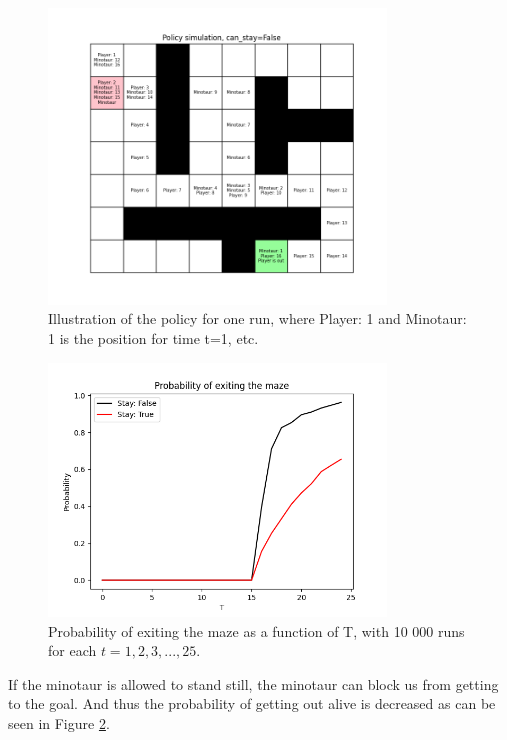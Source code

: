 \documentclass{article}
\begin{document}
\begin{figure}[H]
    \centering
    \includegraphics[width=0.8\textwidth]{Lab_1/images/problem_1/MazeRun_Nov-16-2020_11-55-45.png}
    \caption{\small Illustration of the policy for one run, where Player: 1 and Minotaur: 1 is the position for time t=1, etc. }
    \label{fig:Policy}
\end{figure}

\begin{figure}[H]
    \centering
    \includegraphics[width=0.8\textwidth]{Lab_1/images/problem_1/probability_of_exiting_the_maze_3.png}
    \caption{\small Probability of exiting the maze as a function of T, with 10 000 runs for each $t=1,2,3,...,25$.}
    \label{fig:probability_exiting}
\end{figure}

If the minotaur is allowed to stand still, the minotaur can block us from getting to the goal. And thus the probability of getting out alive is decreased as can be seen in Figure \ref{fig:probability_exiting}.
\end{document}
